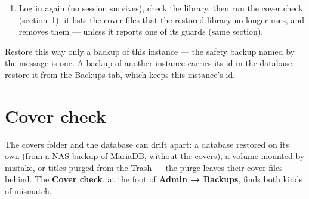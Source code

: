\begin{enumerate}
\begin{lstlisting}
&& sudo test -s backups/database.sql \
&& docker compose exec -T db \
    sh -c 'mariadb -u root -p"$MYSQL_ROOT_PASSWORD" \
    -e "DROP DATABASE $MYSQL_DATABASE;
        CREATE DATABASE $MYSQL_DATABASE CHARACTER SET utf8mb4;"' \
&& sudo cat backups/database.sql | docker compose exec -T db \
    sh -c 'exec mariadb -u root -p"$MYSQL_ROOT_PASSWORD" "$MYSQL_DATABASE"' \
&& docker compose run --rm --no-deps --entrypoint sh mybibli -c \
    'mkdir -p /tmp/x/covers && tar -xzf /app/backups/mybibli-<id>-<stamp>.tar.gz \
     -C /tmp/x && cp -a /tmp/x/covers/. /app/covers/' \
&& sudo rm backups/database.sql backups/.restore-in-progress.json \
&& docker compose start mybibli
\end{lstlisting}
        The \texttt{run} step uses the mybibli image with its own
        volumes, so it finds the covers wherever they are mounted. If
        the chain stops, read the last message, fix the cause and run the
        whole command again. With an external
        database, run the two \texttt{mariadb} steps against that server
        instead.
  \item Log in again (no session survives), check the library, then run
        the cover check (section~\ref{sec:cover-check}): it lists the
        cover files that the restored library no longer uses, and
        removes them --- unless it reports one of its guards (same
        section).
\end{enumerate}

Restore this way only a backup of this instance --- the safety backup
named by the message is one. A backup of another instance carries its
id in the database; restore it from the Backups tab, which keeps this
instance's id.

\section{Cover check}
\label{sec:cover-check}

The covers folder and the database can drift apart: a database
restored on its own (from a NAS backup of MariaDB, without the covers),
a volume mounted by mistake, or titles purged from the Trash --- the
purge leaves their cover files behind. The \textbf{Cover check}, at the
foot of \textbf{Admin → Backups}, finds both kinds of mismatch.

